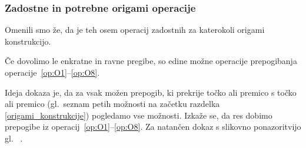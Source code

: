 
\subsubsection{Zadostne in potrebne origami operacije}
\label{podpogl:zadost_potr_op}

Omenili smo že, da je teh osem operacij zadostnih za katerokoli origami konstrukcijo.

\begin{izrek}
    \label{izr:op1do8}
    Če dovolimo le enkratne in ravne pregibe, so edine možne operacije prepogibanja operacije~\ref{op:O1}--\ref{op:O8}.
\end{izrek}

Ideja dokaza je, da za vsak možen prepogib, ki prekrije točko ali premico s točko ali premico (gl.\ seznam petih možnosti na začetku razdelka \ref{origami_konstrukcije}) pogledamo vse možnosti. Izkaže se, da res dobimo prepogibe iz operacij~\ref{op:O1}--\ref{op:O8}. Za natančen dokaz s slikovno ponazoritvijo gl.\ \cite[str.\ 24--26 (izrek 1.1)]{hull2020} \textcolor{red{(Lahko tu dokažeš?)}}.

